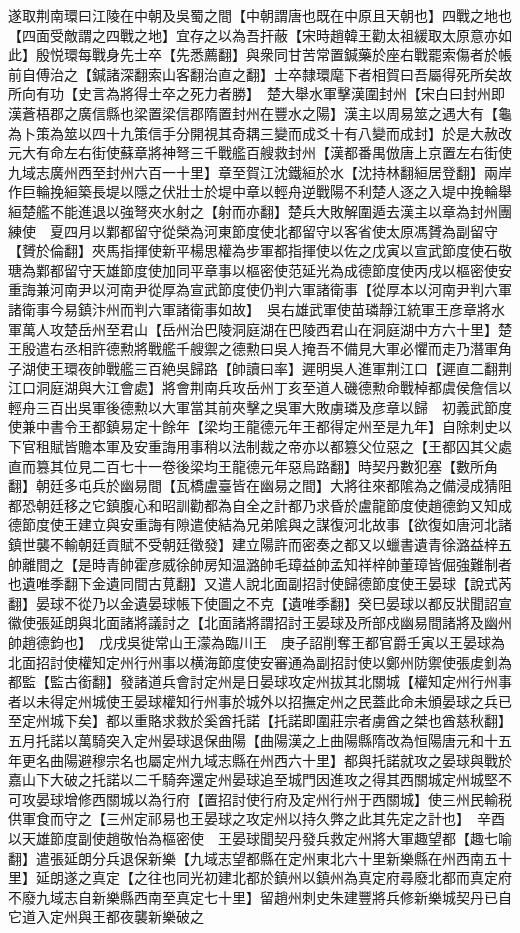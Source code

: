 遂取荆南環曰江陵在中朝及吳蜀之間【中朝謂唐也既在中原且天朝也】四戰之地也【四面受敵謂之四戰之地】宜存之以為吾扞蔽【宋時趙韓王勸太祖緩取太原意亦如此】殷悦環每戰身先士卒【先悉薦翻】與衆同甘苦常置鍼藥於座右戰罷索傷者於帳前自傅治之【鍼諸深翻索山客翻治直之翻】士卒隸環麾下者相賀曰吾屬得死所矣故所向有功【史言為將得士卒之死力者勝】　楚大舉水軍擊漢圍封州【宋白曰封州即漢蒼梧郡之廣信縣也梁置梁信郡隋置封州在豐水之陽】漢主以周易筮之遇大有【龜為卜策為筮以四十九策信手分開視其奇耦三變而成爻十有八變而成封】於是大赦改元大有命左右街使蘇章將神弩三千戰艦百艘救封州【漢都番禺倣唐上京置左右街使九域志廣州西至封州六百一十里】章至賀江沈鐵絙於水【沈持林翻絙居登翻】兩岸作巨輪挽絙築長堤以隱之伏壯士於堤中章以輕舟逆戰陽不利楚人逐之入堤中挽輪舉絙楚艦不能進退以強弩夾水射之【射而亦翻】楚兵大敗解圍遁去漢主以章為封州團練使　夏四月以鄴都留守從榮為河東節度使北都留守以客省使太原馮贇為副留守【贇於倫翻】夾馬指揮使新平楊思權為步軍都指揮使以佐之戊寅以宣武節度使石敬瑭為鄴都留守天雄節度使加同平章事以樞密使范延光為成德節度使丙戌以樞密使安重誨兼河南尹以河南尹從厚為宣武節度使仍判六軍諸衛事【從厚本以河南尹判六軍諸衛事今易鎮汴州而判六軍諸衛事如故】　吳右雄武軍使苗璘靜江統軍王彦章將水軍萬人攻楚岳州至君山【岳州治巴陵洞庭湖在巴陵西君山在洞庭湖中方六十里】楚王殷遣右丞相許德勲將戰艦千艘禦之德勲曰吳人掩吾不備見大軍必懼而走乃潛軍角子湖使王環夜帥戰艦三百絶吳歸路【帥讀曰率】遲明吳人進軍荆江口【遲直二翻荆江口洞庭湖與大江會處】將會荆南兵攻岳州丁亥至道人磯德勲命戰棹都虞侯詹信以輕舟三百出吳軍後德勲以大軍當其前夾擊之吳軍大敗虜璘及彦章以歸　初義武節度使兼中書令王都鎮易定十餘年【梁均王龍德元年王都得定州至是九年】自除刺史以下官租賦皆贍本軍及安重誨用事稍以法制裁之帝亦以都篡父位惡之【王都囚其父處直而篡其位見二百七十一卷後梁均王龍德元年惡烏路翻】時契丹數犯塞【數所角翻】朝廷多屯兵於幽易間【瓦橋盧臺皆在幽易之間】大將往來都隂為之備浸成猜阻都恐朝廷移之它鎮腹心和昭訓勸都為自全之計都乃求昏於盧龍節度使趙德鈞又知成德節度使王建立與安重誨有隙遣使結為兄弟隂與之謀復河北故事【欲復如唐河北諸鎮世襲不輸朝廷貢賦不受朝廷徵發】建立陽許而密奏之都又以蠟書遺青徐潞益梓五帥離間之【是時青帥霍彦威徐帥房知温潞帥毛璋益帥孟知祥梓帥董璋皆倔強難制者也遺唯季翻下金遺同間古莧翻】又遣人說北面副招討使歸德節度使王晏球【說式芮翻】晏球不從乃以金遺晏球帳下使圖之不克【遺唯季翻】癸巳晏球以都反狀聞詔宣徽使張延朗與北面諸將議討之【北面諸將謂招討王晏球及所部戍幽易間諸將及幽州帥趙德鈞也】　戊戌吳徙常山王濛為臨川王　庚子詔削奪王都官爵壬寅以王晏球為北面招討使權知定州行州事以横海節度使安審通為副招討使以鄭州防禦使張䖍釗為都監【監古銜翻】發諸道兵會討定州是日晏球攻定州拔其北關城【權知定州行州事者以未得定州城使王晏球權知行州事於城外以招撫定州之民蓋此命未頒晏球之兵已至定州城下矣】都以重賂求救於奚酋托諾【托諾即圍莊宗者虜酋之桀也酋慈秋翻】五月托諾以萬騎突入定州晏球退保曲陽【曲陽漢之上曲陽縣隋改為恒陽唐元和十五年更名曲陽避穆宗名也屬定州九域志縣在州西六十里】都與托諾就攻之晏球與戰於嘉山下大破之托諾以二千騎奔還定州晏球追至城門因進攻之得其西關城定州城堅不可攻晏球增修西關城以為行府【置招討使行府及定州行州于西關城】使三州民輸税供軍食而守之【三州定祁易也王晏球之攻定州以持久弊之此其先定之計也】　辛酉以天雄節度副使趙敬怡為樞密使　王晏球聞契丹發兵救定州將大軍趣望都【趣七喻翻】遣張延朗分兵退保新樂【九域志望都縣在定州東北六十里新樂縣在州西南五十里】延朗遂之真定【之往也同光初建北都於鎮州以鎮州為真定府尋廢北都而真定府不廢九域志自新樂縣西南至真定七十里】留趙州刺史朱建豐將兵修新樂城契丹已自它道入定州與王都夜襲新樂破之